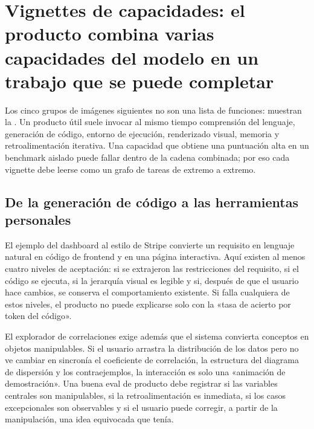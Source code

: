 \section{Vignettes de capacidades: el producto combina varias capacidades del modelo en un trabajo que se puede completar}

Los cinco grupos de imágenes siguientes no son una lista de funciones: muestran la . Un producto útil suele invocar al mismo tiempo comprensión del lenguaje, generación de código, entorno de ejecución, renderizado visual, memoria y retroalimentación iterativa. Una capacidad que obtiene una puntuación alta en un benchmark aislado puede fallar dentro de la cadena combinada; por eso cada vignette debe leerse como un grafo de tareas de extremo a extremo.

\subsection{De la generación de código a las herramientas personales}

El ejemplo del dashboard al estilo de Stripe convierte un requisito en lenguaje natural en código de frontend y en una página interactiva. Aquí existen al menos cuatro niveles de aceptación: si se extrajeron las restricciones del requisito, si el código se ejecuta, si la jerarquía visual es legible y si, después de que el usuario hace cambios, se conserva el comportamiento existente. Si falla cualquiera de estos niveles, el producto no puede explicarse solo con la «tasa de acierto por token del código».



El explorador de correlaciones exige además que el sistema convierta conceptos en objetos manipulables. Si el usuario arrastra la distribución de los datos pero no ve cambiar en sincronía el coeficiente de correlación, la estructura del diagrama de dispersión y los contraejemplos, la interacción es solo una «animación de demostración». Una buena eval de producto debe registrar si las variables centrales son manipulables, si la retroalimentación es inmediata, si los casos excepcionales son observables y si el usuario puede corregir, a partir de la manipulación, una idea equivocada que tenía.

